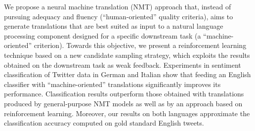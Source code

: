 We propose a neural machine translation (NMT) approach that, instead of pursuing adequacy and fluency (``human-oriented'' quality criteria), aims to generate translations that are best suited as input to a natural language processing component designed for a specific downstream task (a ``machine-oriented'' criterion). Towards this objective, we present a reinforcement learning technique based on a new candidate sampling strategy, which exploits the results obtained on the downstream task as weak feedback. Experiments in sentiment classification of Twitter data in German and Italian show that feeding an English classifier with ``machine-oriented'' translations significantly improves its performance. Classification results outperform those obtained with translations produced by general-purpose NMT models as well as by an approach based on reinforcement learning. Moreover, our results on both languages approximate the classification accuracy computed on gold standard English tweets.
